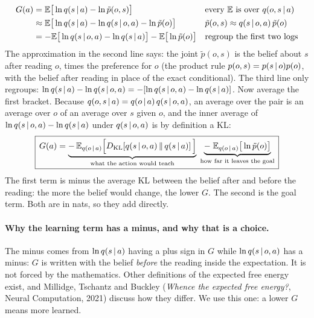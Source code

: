 \documentclass[11pt]{article}
\begin{document}
\begin{align*}
G(a) &= \mathbb{E}\big[\ln q(s\,|\, a) - \ln\tilde p(o,s)\big] && \text{every }\mathbb{E}\text{ is over }q(o,s\,|\, a)\\
&\approx \mathbb{E}\big[\ln q(s\,|\, a) - \ln q(s\,|\, o,a) - \ln\tilde p(o)\big] && \tilde p(o,s)\approx q(s\,|\, o,a)\,\tilde p(o)\\
&= -\mathbb{E}\big[\ln q(s\,|\, o,a) - \ln q(s\,|\, a)\big] - \mathbb{E}\big[\ln\tilde p(o)\big] && \text{regroup the first two logs}
\end{align*}
The approximation in the second line says: the joint $\tilde p(o,s)$ is the belief about $s$ after reading $o$, times the preference for $o$ (the product rule $p(o,s) = p(s\,|\, o)p(o)$, with the belief after reading in place of the exact conditional). The third line only regroups: $\ln q(s\,|\, a) - \ln q(s\,|\, o,a) = -[\ln q(s\,|\, o,a) - \ln q(s\,|\, a)]$. Now average the first bracket. Because $q(o,s\,|\, a) = q(o\,|\, a)\,q(s\,|\, o,a)$, an average over the pair is an average over $o$ of an average over $s$ given $o$, and the inner average of $\ln q(s\,|\, o,a) - \ln q(s\,|\, a)$ under $q(s\,|\, o,a)$ is by definition a KL:
\[
\boxed{\,G(a) = \underbrace{-\,\mathbb{E}_{q(o\,|\, a)}\Big[D_{\mathrm{KL}}\!\left[q(s\,|\, o,a)\,\middle\|\,q(s\,|\, a)\right]\Big]}_{\text{what the action would teach}}\;\underbrace{-\;\mathbb{E}_{q(o\,|\, a)}\big[\ln\tilde p(o)\big]}_{\text{how far it leaves the goal}}\,}
\]
The first term is minus the average KL between the belief after and before the reading: the more the belief would change, the lower $G$. The second is the goal term. Both are in nats, so they add directly.

\paragraph{Why the learning term has a minus, and why that is a choice.} The minus comes from $\ln q(s\,|\, a)$ having a plus sign in $G$ while $\ln q(s\,|\, o,a)$ has a minus: $G$ is written with the belief \emph{before} the reading inside the expectation. It is not forced by the mathematics. Other definitions of the expected free energy exist, and Millidge, Tschantz and Buckley (\emph{Whence the expected free energy?}, Neural Computation, 2021) discuss how they differ. We use this one: a lower $G$ means more learned.
\end{document}
